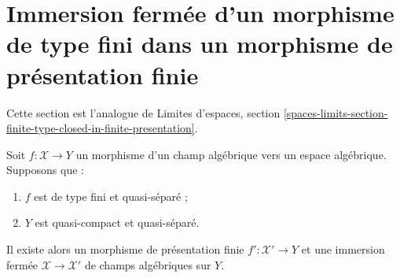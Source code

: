 \section[Immersion fermée et présentation finie]{Immersion fermée d'un morphisme de type fini dans un morphisme de présentation finie}
\label{section-finite-type-closed-in-finite-presentation}

\noindent
Cette section est l'analogue de Limites d'espaces, section
\ref{spaces-limits-section-finite-type-closed-in-finite-presentation}.

\begin{lemma}
\label{lemma-finite-type-closed-in-finite-presentation}
Soit $f : \mathcal{X} \to Y$ un morphisme d'un champ algébrique vers un espace
algébrique. Supposons que :
\begin{enumerate}
\item $f$ est de type fini et quasi-séparé ;
\item $Y$ est quasi-compact et quasi-séparé.
\end{enumerate}
Il existe alors un morphisme de présentation finie
$f' : \mathcal{X}' \to Y$ et une immersion fermée
$\mathcal{X} \to \mathcal{X}'$ de champs algébriques sur $Y$.
\end{lemma}

